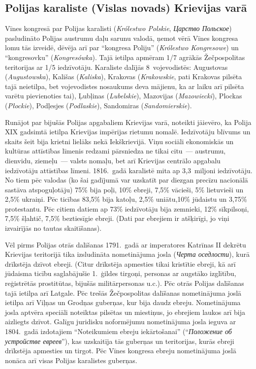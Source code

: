 \documentclass[twoside,a5paper,12pt,fleqn,openany]{extbook}
\newcommand{\pltxti}[1]{\textit{\textpolish{#1}}}
\newcommand{\rutxti}[1]{\textit{\textrussian{#1}}}
\begin{document}
\subsection{Polijas karaliste (Vislas novads) Krievijas varā}

Vīnes kongresā par Polijas karalisti (\pltxti{Królestwo Polskie}, \rutxti{Царство Польское}) pasludināto Polijas austrumu daļu sarunu valodā, ņemot vērā Vīnes kongresa lomu tās izveidē, dēvēja arī par ``kongresa Poliju'' (\pltxti{Królestwo Kongresowe}) un ``kongresovku'' (\pltxti{Kongresówka}). Tajā ietilpa apmēram 1/7 agrākās Žečpospolitas teritorijas ar 1/5 iedzīvotāju. Karaliste dalījās 8~vojevodistēs: Augustovas (\pltxti{Augustowska}), Kališas (\pltxti{Kaliska}), Krakovas (\pltxti{Krakowskie}, pati Krakovas pilsēta tajā neietilpa, bet vojevodistes nosaukums deva mājienu, ka ar laiku arī pilsēta varētu pievienoties tai), Ļubļinas (\pltxti{Lubelskie}), Mazovijas (\pltxti{Mazowiecki}), Plockas (\pltxti{Płockie}), Podļesjes (\pltxti{Podlaskie}), Sandomiras (\pltxti{Sandomierskie}).

Runājot par bijušās Polijas apgabaliem Krievijas varā, noteikti jāievēro, ka Polija XIX gadsimtā ietilpa Krievijas impērijas rietumu nomalē. Iedzīvotāju blīvums un skaits šeit bija krietni lielāks nekā Iekškrievijā. Viņu sociāli ekonomiskās un kultūras attīstības līmenis redzami pārsniedza ne tikai citu~--- austrumu, dienvidu, ziemeļu~--- valsts nomaļu, bet arī Krievijas centrālo apgabalu iedzīvotāju attīstības līmeni. 1816.~gadā karalistē mita ap 3,3~miljoni iedzīvotāju. No tiem pēc valodas (ko šai gadījumā var uzskatīt par diezgan precīzu nacionālā sastāva atspoguļotāju) 75\% bija poļi, 10\% ebreji, 7,5\% vācieši, 5\% lietuvieši un 2,5\% ukraiņi. Pēc ticības 83,5\% bija katoļu, 2,5\% uniātu,10\% jūdaistu un 3,75\% protestantu. Pēc citiem datiem ap 73\% iedzīvotāju bija zemnieki, 12\% sīkpilsoņi, 7,5\% šļahtič, 7,5\% beztiesīgie ebreji. (Dati par ebrejiem ir atšķirīgi, jo viņi izvairījās no tautas skaitīšanas).

Vēl pirms Polijas otrās dalīšanas 1791.~gadā ar imperatores Katrīnas II dekrētu Krievijas teritorijā tika izsludināta nometinājuma josla (\rutxti{Черта оседлости}), kurā drīkstēja dzīvot ebreji. (Citur drīkstēja apmesties tikai kristītie ebreji, kā arī jūdaisma ticību saglabājušie 1.~ģildes tirgoņi, personas ar augstāko izglītību, reģistrētās prostitūtas, bijušās militārpersonas u.c.). Pēc otrās Polijas dalīšanas tajā ietilpa arī Latgale. Pēc trešās Žečpospolitas dalīšanas nometinājuma joslā ietilpa arī Viļņas un Grodņas guberņas, kur bija daudz ebreju. Nometinājuma josla aptvēra speciāli noteiktas pilsētas un miestiņus, jo ebrejiem laukos arī bija aizliegts dzīvot. Galīgu juridisku noformējumu nometinājuma josla ieguva ar 1804.~gadā izdotajiem ``Noteikumiem ebreju iekārtošanai'' (``\rutxti{Положение об устройстве евреев}''), kas uzskaitīja tās guberņas un teritorijas, kurās ebreji drīkstēja apmesties un tirgot. Pēc Vīnes kongresa ebreju nometinājuma joslā nonāca arī visas Polijas karalistes guberņas.
\end{document}
